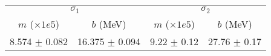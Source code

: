 \begin{tabular}{cc|cc}
\multicolumn{2}{c|}{$\sigma_1$} & \multicolumn{2}{|c}{$\sigma_2$} \\
$m$ ($\times1e5$) & $b$ (MeV) & $m$ ($\times1e5$) & $b$ (MeV) \\
\hline
8.574 $\pm$ 0.082 & 16.375 $\pm$ 0.094 & 9.22 $\pm$ 0.12 & 27.76 $\pm$ 0.17\\
\end{tabular}
